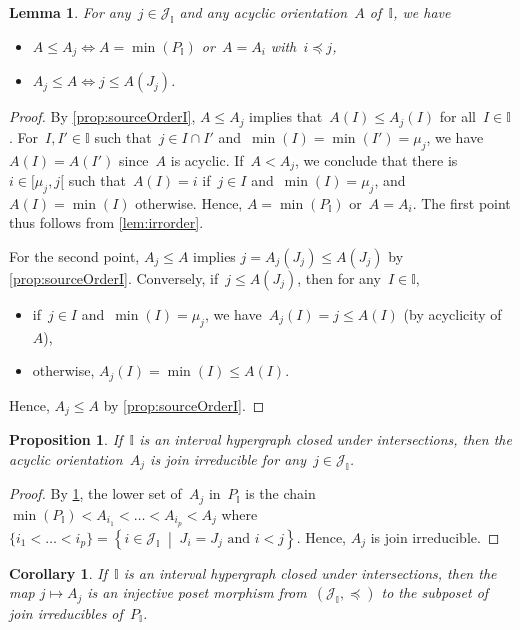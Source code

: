 \documentclass{amsart}
\newtheorem{corollary}[theorem]{Corollary}
\newtheorem{proposition}[theorem]{Proposition}
\newtheorem{lemma}[theorem]{Lemma}
\theoremstyle{definition}
\newcommand{\cal}[1]{\mathcal{#1}} %
\newcommand{\set}[2]{\left\{ #1 \;\middle|\; #2 \right\}} %
\newcommand{\II}{\mathbb I} %
\newcommand{\cJ}{\cal{J}} %
\begin{document}
\begin{lemma}
\label{lem:subirr}
For any~$j \in \cJ_\II$ and any acyclic orientation~$A$ of~$\II$, we have
\begin{itemize}
\item $A \le A_j \iff A = \min(P_\II)$ or~$A = A_i$ with~$i \preccurlyeq j$,
\item $A_j \le A \iff j \le A(J_j)$.
\end{itemize}
\end{lemma}

\begin{proof}
By \cref{prop:sourceOrderI}, $A \le A_j$ implies that~$A(I) \le A_j(I)$ for all~$I \in \II$.
For~$I, I' \in \II$ such that~$j \in I \cap I'$ and~$\min(I) = \min(I') = \mu_j$, we have~$A(I) = A(I')$ since~$A$ is acyclic.
If~$A < A_j$, we conclude that there is~$i \in {[\mu_j, j[}$ such that~$A(I) = i$ if~$j \in I$ and~$\min(I) = \mu_j$, and~$A(I) = \min(I)$ otherwise.
Hence, $A = \min(P_\II)$ or~$A = A_i$.
The first point thus follows from \cref{lem:irrorder}.

For the second point, $A_j \le A$ implies $j = A_j(J_j) \le A(J_j)$ by \cref{prop:sourceOrderI}.
Conversely, if~$j \le A(J_j)$, then for any~$I \in \II$,
\begin{itemize}
\item if~$j \in I$ and~$\min(I) = \mu_j$, we have~$A_j(I) = j \le A(I)$ (by acyclicity of~$A$),
\item otherwise, $A_j(I) = \min(I) \le A(I)$.
\end{itemize}
Hence, $A_j \le A$ by \cref{prop:sourceOrderI}.
\end{proof}

\begin{proposition}
\label{prop:AjJoinIrreducible}
If~$\II$ is an interval hypergraph closed under intersections, then the acyclic orientation~$A_j$ is join irreducible for any~$j\in \cJ_\II$.
\end{proposition}

\begin{proof}
By \cref{lem:subirr}, the lower set of~$A_j$ in~$P_\II$ is the chain $\min(P_\II) < A_{i_1} < \dots < A_{i_p} < A_j$ where~$\{i_1 < \dots < i_p\} = \set{i \in \cJ_\II}{J_i = J_j \text{ and } i < j}$.
Hence, $A_j$ is join irreducible.
\end{proof}

\begin{corollary}
\label{coro:irreduciblePosetMorphism}
If~$\II$ is an interval hypergraph closed under intersections, then the map $j \mapsto A_j$ is an injective poset morphism from~$(\cJ_\II, \preccurlyeq)$ to the subposet of join irreducibles of~$P_\II$.
\end{corollary}
\end{document}
